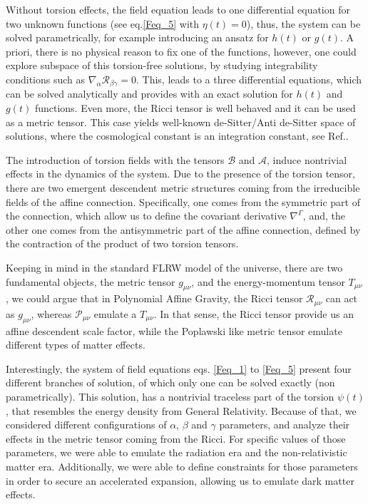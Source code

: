 \documentclass{article}
\begin{document}
Without torsion effects, the field equation leads to one differential equation for two 
unknown functions (see eq.\eqref{Feq_5} with $\eta(t) = 0$), thus, the system can be 
solved parametrically, for example introducing an ansatz for $h(t)$ or $g(t)$. A priori, there 
is no physical reason to fix one of the functions, however, one could explore subspace of 
this torsion-free solutions, by studying  integrability conditions such as $\nabla_\alpha 
\mathcal{R}_{\beta\gamma} = 0$. This, leads to a three differential equations, which can 
be solved analytically and provides with an exact solution for $h(t)$ and $g(t)$ functions. 
Even more, the Ricci tensor is well behaved and it can be used as a metric tensor. This case 
yields well-known de-Sitter/Anti de-Sitter space of solutions, where the cosmological constant is an
integration constant, see Ref.\cite{Castillo_Felisola_2020}.

The introduction of torsion fields with the tensors $\mathcal{B}$ and $\mathcal{A}$, induce 
nontrivial effects in the dynamics of the system. Due to the presence of the torsion tensor, 
there are two emergent descendent metric structures coming from the irreducible fields of the 
affine connection. Specifically, one comes from the symmetric part of the connection, which 
allow us to define the covariant derivative $\nabla^{\Gamma}$, and, the other one comes from 
the antisymmetric part of the affine connection, defined by the contraction of the product 
of two torsion tensors. 

Keeping in mind in the standard FLRW model of the universe, there are two fundamental objects, 
the metric tensor $g_{\mu\nu}$, and the energy-momentum tensor $T_{\mu\nu}$, we could argue
that in Polynomial Affine Gravity, the Ricci tensor $\mathcal{R}_{\mu\nu}$ can act as $g_{\mu\nu}$,
whereas $\mathcal{P}_{\mu\nu}$ emulate a $T_{\mu\nu}$. In that sense, the Ricci tensor provide us
an affine descendent scale factor, while the Poplawski like metric tensor emulate different types 
of matter effects.

Interestingly, the system of field equations eqs. \eqref{Feq_1} to \eqref{Feq_5} present four different 
branches of solution, of which only one can be solved exactly (non parametrically). This solution, has a 
nontrivial traceless part of the torsion $\psi(t)$, that resembles the energy density from General Relativity. 
Because of that, we considered different configurations of $\alpha$, $\beta$ and $\gamma$ parameters, 
and analyze their effects in the metric tensor coming from the Ricci. For specific values of those parameters, 
we were able to emulate the radiation era and the non-relativistic matter era. Additionally, we were able to 
define constraints for those parameters in order to secure an accelerated expansion, allowing us to emulate dark 
matter effects.
\end{document}
